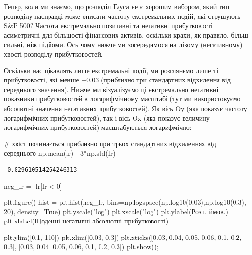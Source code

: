 \documentclass[
  letterpaper,
]{report}
\newenvironment{Shaded}{\begin{snugshade}}{\end{snugshade}}
\newcommand{\CommentTok}[1]{\textcolor[rgb]{0.37,0.37,0.37}{#1}}
\newcommand{\DecValTok}[1]{\textcolor[rgb]{0.68,0.00,0.00}{#1}}
\newcommand{\FloatTok}[1]{\textcolor[rgb]{0.68,0.00,0.00}{#1}}
\newcommand{\NormalTok}[1]{\textcolor[rgb]{0.00,0.23,0.31}{#1}}
\newcommand{\OperatorTok}[1]{\textcolor[rgb]{0.37,0.37,0.37}{#1}}
\newcommand{\StringTok}[1]{\textcolor[rgb]{0.13,0.47,0.30}{#1}}
\newcommand{\VariableTok}[1]{\textcolor[rgb]{0.07,0.07,0.07}{#1}}
\begin{document}
Тепер, коли ми знаємо, що розподіл Гауса не є хорошим вибором, який тип
розподілу насправді може описати частоту екстремальних подій, які
струшують S\&P 500? Частота екстремально позитивні та негативні
прибутковості асиметричні для більшості фінансових активів, оскільки
крахи, як правило, більш сильні, ніж підйоми. Ось чому нижче ми
зосередимося на лівому (негативному) хвості розподілу прибутковостей.

Оскільки нас цікавлять лише екстремальні події, ми розглянемо лише ті
прибутковості, які менше \(-0.03\) (приблизно три стандартних відхилення
від середнього значення). Нижче ми візуалізуємо ці екстремально
негативні показники прибутковостей в
\href{https://en.wikipedia.org/wiki/Log\%E2\%80\%93log_plot}{логарифмічному
масштабі} (тут ми використовуємо абсолютні значення негативних
прибутковостей). Як вісь Oy (яка показує частоту логарифмічних
прибутковостей), так і вісь Ox (яка показує величину логарифмічних
прибутковостей) масштабуються логарифмічно:

\begin{Shaded}
\begin{Highlighting}[]
\CommentTok{\# хвіст починається приблизно при трьох стандартних відхиленнях від середнього}
\NormalTok{np.mean(lr) }\OperatorTok{{-}} \DecValTok{3}\OperatorTok{*}\NormalTok{np.std(lr)}
\end{Highlighting}
\end{Shaded}

\begin{verbatim}
-0.029610514264246313
\end{verbatim}

\begin{Shaded}
\begin{Highlighting}[]
\NormalTok{neg\_lr }\OperatorTok{=} \OperatorTok{{-}}\NormalTok{lr[lr }\OperatorTok{\textless{}} \DecValTok{0}\NormalTok{]}

\NormalTok{plt.figure()}
\NormalTok{hist }\OperatorTok{=}\NormalTok{ plt.hist(neg\_lr, bins}\OperatorTok{=}\NormalTok{np.logspace(np.log10(}\FloatTok{0.03}\NormalTok{),np.log10(}\FloatTok{0.3}\NormalTok{), }\DecValTok{20}\NormalTok{), density}\OperatorTok{=}\VariableTok{True}\NormalTok{)}
\NormalTok{plt.yscale(}\StringTok{"log"}\NormalTok{)}
\NormalTok{plt.xscale(}\StringTok{"log"}\NormalTok{)}
\NormalTok{plt.ylabel(}\StringTok{\textquotesingle{}Розп. ймов.\textquotesingle{}}\NormalTok{)}
\NormalTok{plt.xlabel(}\StringTok{\textquotesingle{}Щоденні негативні абсолютні прибутковості\textquotesingle{}}\NormalTok{)}

\NormalTok{plt.ylim([}\FloatTok{0.1}\NormalTok{, }\DecValTok{110}\NormalTok{])}
\NormalTok{plt.xlim([}\FloatTok{0.03}\NormalTok{, }\FloatTok{0.3}\NormalTok{])}
\NormalTok{plt.xticks([}\FloatTok{0.03}\NormalTok{, }\FloatTok{0.04}\NormalTok{, }\FloatTok{0.05}\NormalTok{, }\FloatTok{0.06}\NormalTok{, }\FloatTok{0.1}\NormalTok{, }\FloatTok{0.2}\NormalTok{, }\FloatTok{0.3}\NormalTok{], [}\FloatTok{0.03}\NormalTok{, }\FloatTok{0.04}\NormalTok{, }\FloatTok{0.05}\NormalTok{, }\FloatTok{0.06}\NormalTok{, }\FloatTok{0.1}\NormalTok{, }\FloatTok{0.2}\NormalTok{, }\FloatTok{0.3}\NormalTok{])}
\NormalTok{plt.show()}\OperatorTok{;}
\end{Highlighting}
\end{Shaded}
\end{document}
